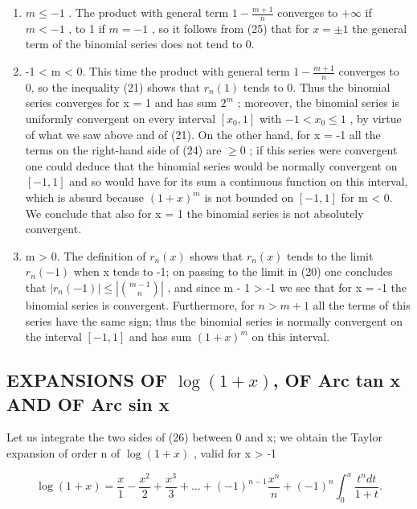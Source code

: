 \begin{enumerate}
\def\labelenumi{\alph{enumi})}
\item
  \(m \leqslant -1\) . The product with general term \(1 - \frac{m + 1}{n}\) converges to \(+\infty\) if \(m < -1\) , to 1 if \(m = -1\) , so it follows from (25) that for \(x = \pm 1\) the general term of the binomial series does not tend to 0.
\item
  -1 \textless{} m \textless{} 0. This time the product with general term \(1 - \frac{m + 1}{n}\) converges to 0, so the inequality (21) shows that \(r_{n}(1)\) tends to 0. Thus the binomial series converges for x = 1 and has sum \(2^{m}\) ; moreover, the binomial series is uniformly convergent on every interval \([x_{0}, 1]\) with \(-1 < x_{0} \leqslant 1\) , by virtue of what we saw above and of (21). On the other hand, for x = -1 all the terms on the right-hand side of (24) are \(\geqslant 0\) ; if this series were convergent one could deduce that the binomial series would be normally convergent on \([-1, 1]\) and so would have for its sum a continuous function on this interval, which is absurd because \((1 + x)^{m}\) is not bounded on \([-1, 1]\) for m \textless{} 0. We conclude that also for x = 1 the binomial series is not absolutely convergent.
\item
  m \textgreater{} 0. The definition of \(r_{n}(x)\) shows that \(r_{n}(x)\) tends to the limit \(r_{n}(-1)\) when x tends to -1; on passing to the limit in (20) one concludes that \(|r_{n}(-1)| \leqslant \left|\binom{m-1}{n}\right|\) , and since m - 1 \textgreater{} -1 we see that for x = -1 the binomial series is convergent. Furthermore, for \(n > m + 1\) all the terms of this series have the same sign; thus the binomial series is normally convergent on the interval \([-1, 1]\) and has sum \((1 + x)^{m}\) on this interval.
\end{enumerate}

\subsection{\texorpdfstring{EXPANSIONS OF \(\log(1 + x)\), OF Arc tan x AND OF Arc sin x}{EXPANSIONS OF LOG(1 + X), ARC TAN X AND ARC SIN X}}

Let us integrate the two sides of (26) between 0 and x; we obtain the Taylor expansion of order n of \(\log(1 + x)\) , valid for x \textgreater{} -1

\[
\log (1 + x) = \frac {x}{1} - \frac {x ^ {2}}{2} + \frac {x ^ {3}}{3} + \dots + (- 1) ^ {n - 1} \frac {x ^ {n}}{n} + (- 1) ^ {n} \int_ {0} ^ {x} \frac {t ^ {n} d t}{1 + t}.\tag{27}
\]

